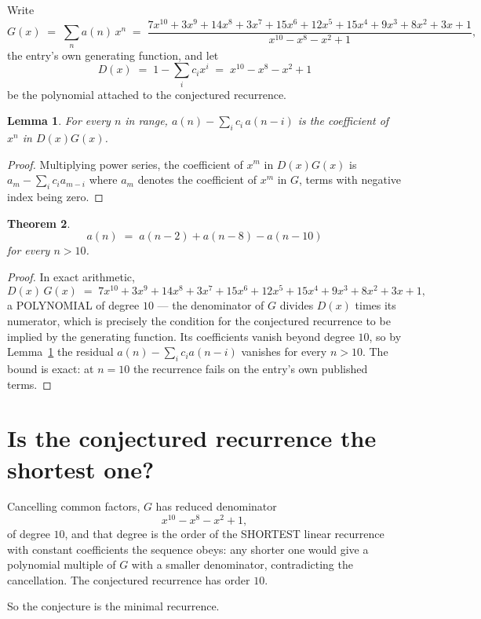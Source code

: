 \documentclass[11pt,a4paper]{article}
\theoremstyle{plain}
\newtheorem{theorem}{Theorem}
\newtheorem{lemma}[theorem]{Lemma}
\theoremstyle{definition}
\begin{document}
Write
\[
G(x)\;=\;\sum_{n}a(n)\,x^{n}\;=\;\frac{7 x^{10} + 3 x^{9} + 14 x^{8} + 3 x^{7} + 15 x^{6} + 12 x^{5} + 15 x^{4} + 9 x^{3} + 8 x^{2} + 3 x + 1}{x^{10} - x^{8} - x^{2} + 1},
\]
the entry's own generating function, and let
\[
D(x)\;=\;1-\sum_i c_i x^{i}\;=\;x^{10} - x^{8} - x^{2} + 1
\]
be the polynomial attached to the conjectured recurrence.

\begin{lemma}\label{lem:key}
For every $n$ in range, $a(n)-\sum_i c_i\,a(n-i)$ is the coefficient of $x^{n}$ in
$D(x)G(x)$.
\end{lemma}

\begin{proof}
Multiplying power series, the coefficient of $x^{m}$ in $D(x)G(x)$ is
$a_m-\sum_i c_i a_{m-i}$ where $a_m$ denotes the coefficient of $x^{m}$ in $G$, terms with
negative index being zero.
\end{proof}

\begin{theorem}
\[
a(n)\;=\;a(n-2) + a(n-8) - a(n-10)
\]
for every $n>10$.
\end{theorem}

\begin{proof}
In exact arithmetic,
\[
D(x)\,G(x)\;=\;7 x^{10} + 3 x^{9} + 14 x^{8} + 3 x^{7} + 15 x^{6} + 12 x^{5} + 15 x^{4} + 9 x^{3} + 8 x^{2} + 3 x + 1,
\]
a POLYNOMIAL of degree $10$ --- the denominator of $G$ divides $D(x)$ times its numerator,
which is precisely the condition for the conjectured recurrence to be implied by the
generating function. Its coefficients vanish beyond degree $10$, so by
Lemma~\ref{lem:key} the residual $a(n)-\sum_ic_ia(n-i)$ vanishes for every
$n>10$. The bound is exact: at $n=10$ the recurrence fails on the entry's own published terms.
\end{proof}

\section{Is the conjectured recurrence the shortest one?}

Cancelling common factors, $G$ has reduced denominator
\[
x^{10} - x^{8} - x^{2} + 1,
\]
of degree $10$, and that degree is the order of the SHORTEST linear recurrence with
constant coefficients the sequence obeys: any shorter one would give a polynomial multiple of
$G$ with a smaller denominator, contradicting the cancellation. The conjectured recurrence has
order $10$.

So the conjecture is the minimal recurrence.
\end{document}
